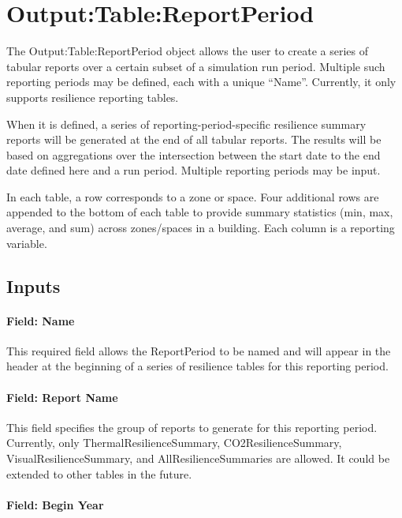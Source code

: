 \section{Output:Table:ReportPeriod}\label{outputtablereportperiod}

The Output:Table:ReportPeriod object allows the user to create a series of
tabular reports over a certain subset of a simulation run period. Multiple such
reporting periods may be defined, each with a unique ``Name''. Currently, it only
supports resilience reporting tables.

When it is defined, a series of reporting-period-specific resilience summary
reports will be generated at the end of all tabular reports. The results will be
based on aggregations over the intersection between the start date to the end
date defined here and a run period. Multiple reporting periods may be input.

In each table, a row corresponds to a zone or space. Four additional rows are
appended to the bottom of each table to provide summary statistics (min, max,
average, and sum) across zones/spaces in a building. Each column is a reporting
variable.

\subsection{Inputs}\label{inputs-074}

\paragraph{Field: Name}\label{field-name-066}

This required field allows the ReportPeriod to be named and will appear in the
header at the beginning of a series of resilience tables for this reporting
period.

\paragraph{Field: Report Name}\label{report-name-1}

This field specifies the group of reports to generate for this reporting period.
Currently, only ThermalResilienceSummary, CO2ResilienceSummary,
VisualResilienceSummary, and AllResilienceSummaries are allowed. It could be
extended to other tables in the future.

\paragraph{Field: Begin Year}\label{field-begin-year-2}

